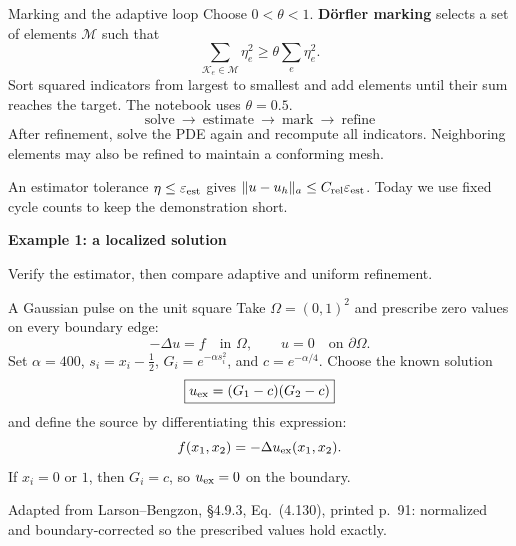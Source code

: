 \documentclass[11pt,aspectratio=169]{beamer}
\newcommand{\Om}{\Omega}
\newcommand{\norm}[2][]{\lVert#2\rVert_{#1}}
\begin{document}
\begin{frame}{Marking and the adaptive loop}
Choose $0<\theta<1$. \textbf{D\"orfler marking} selects a set of elements
$\mathcal M$ such that
\[
\boxed{\sum_{\mathcal K_e\in\mathcal M}\eta_e^2
       \ge\theta\sum_e\eta_e^2.}
\]
Sort squared indicators from largest to smallest and add elements until their
sum reaches the target. The notebook uses $\theta=0.5$.
\[
\boxed{\text{solve}\ \longrightarrow\ \text{estimate}\ \longrightarrow\
       \text{mark}\ \longrightarrow\ \text{refine}}
\]
After refinement, solve the PDE again and recompute all indicators.
Neighboring elements may also be refined to maintain a conforming mesh.

An estimator tolerance $\eta\le\varepsilon_{\rm est}$ gives
$\norm[a]{u-u_h}\le C_{\rm rel}\varepsilon_{\rm est}$.
Today we use fixed cycle counts to keep the demonstration short.
\end{frame}

\begin{frame}
\centering\vfill
{\LARGE\bfseries Example 1: a localized solution\par}
\vspace{0.35cm}
{\large Verify the estimator, then compare adaptive and uniform refinement.\par}
\vfill
\end{frame}

\begin{frame}{A Gaussian pulse on the unit square}
Take $\Om=(0,1)^2$ and prescribe zero values on every boundary edge:
\[
-\Delta u=f\quad\text{in }\Om,\qquad u=0\quad\text{on }\partial\Om.
\]
Set $\alpha=400$, $s_i=x_i-\tfrac12$, $G_i=e^{-\alpha s_i^2}$, and
$c=e^{-\alpha/4}$. Choose the known solution
\[
\boxed{u_{\rm ex}=(G_1-c)(G_2-c)}
\]
and define the source by differentiating this expression:
\[
f(x_1,x_2)=-\Delta u_{\rm ex}(x_1,x_2).
\]
If $x_i=0$ or $1$, then $G_i=c$, so $u_{\rm ex}=0$ on the boundary.

{\small Adapted from Larson--Bengzon, \S4.9.3, Eq.~(4.130), printed p.~91:
normalized and boundary-corrected so the prescribed values hold exactly.}
\end{frame}
\end{document}
